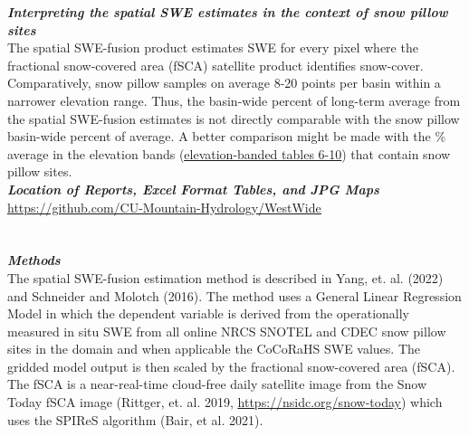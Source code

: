 \documentclass{article}
\begin{document}
\fontsize{12}{16}
\noindent\textbf{\textit{Interpreting the spatial SWE estimates in the context of snow pillow sites}}\\
\fontsize{10}{14}
\noindent The spatial SWE-fusion product estimates SWE for every pixel where the fractional snow-covered area (fSCA) satellite product identifies snow-cover. Comparatively, snow pillow samples on average 8-20 points per basin within a narrower elevation range. Thus, the basin-wide percent of long-term average from the spatial SWE-fusion estimates is not directly comparable with the snow pillow basin-wide percent of average. A better comparison might be made with the \% average in the elevation bands (\href{https://github.com/CU-Mountain-Hydrology/WestWide}{\underline{elevation-banded tables 6-10}}) that contain snow pillow sites.\\

\fontsize{12}{16}
\noindent\textbf{\textit{Location of Reports, Excel Format Tables, and JPG Maps}}\\
\fontsize{10}{14}
\noindent \href{https://github.com/CU-Mountain-Hydrology/WestWide}{\underline{https://github.com/CU-Mountain-Hydrology/WestWide}}

\section*{}\label{sec:methods}\vspace{-3em}
\fontsize{12}{16}
\noindent\textbf{\textit{Methods}}\\
\fontsize{10}{14}
\noindent The spatial SWE-fusion estimation method is described in Yang, et. al. (2022) and Schneider and Molotch (2016). The method uses a General Linear Regression Model in which the dependent variable is derived from the operationally measured in situ SWE from all online NRCS SNOTEL and CDEC snow pillow sites in the domain and when applicable the CoCoRaHS SWE values. The gridded model output is then scaled by the fractional snow-covered area (fSCA). The fSCA is a near-real-time cloud-free daily satellite image from the Snow Today fSCA image (Rittger, et. al. 2019, \href{https://nsidc.org/snow-today}{\underline{https://nsidc.org/snow-today}}) which uses the SPIReS algorithm (Bair, et al. 2021).\\
\end{document}
